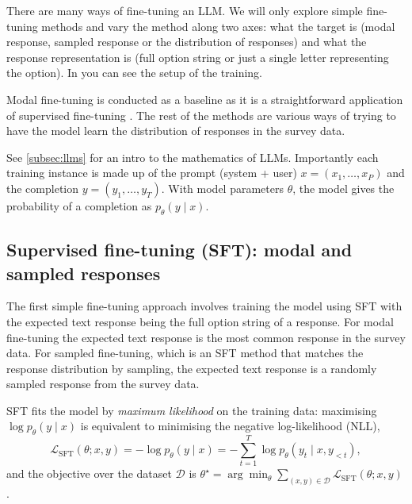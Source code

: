 There are many ways of fine-tuning an LLM. We will only explore simple fine-tuning methods and vary the method along two axes: what the target is (modal response, sampled response or the distribution of responses) and what the response representation is (full option string or just a single letter representing the option). In  you can see the setup of the training. 

Modal fine-tuning is conducted as a baseline as it is a straightforward application of supervised fine-tuning \cite{ouyangTrainingLanguageModels2022}. The rest of the methods are various ways of trying to have the model learn the distribution of responses in the survey data.

See \ref{subsec:llms} for an intro to the mathematics of LLMs. Importantly each training instance is made up of the prompt (system + user) $x=(x_1, \dots, x_P)$ and the completion $y=(y_1, \dots, y_T)$. With model parameters $\theta$, the model gives the probability of a completion as $p_\theta(y \mid x)$.



\subsection{Supervised fine-tuning (SFT): modal and sampled responses}

The first simple fine-tuning approach involves training the model using SFT with the expected text response being the full option string of a response. For modal fine-tuning the expected text response is the most common response in the survey data. For sampled fine-tuning, which is an SFT method that matches the response distribution by sampling, the expected text response is a randomly sampled response from the survey data.

SFT fits the model by \emph{maximum likelihood} on the training data:
maximising $\log p_\theta(y \mid x)$ is equivalent to minimising the
negative log-likelihood (NLL),
\begin{equation}
  \mathcal{L}_{\mathrm{SFT}}(\theta; x, y)
  = -\log p_\theta(y \mid x)
  = -\!\sum_{t=1}^{T} \log p_\theta\!\left(y_t \mid x, y_{<t}\right),
  \label{eq:nll}
\end{equation}
and the objective over the dataset $\mathcal{D}$ is
$\theta^\star = \arg\min_\theta \sum_{(x,y)\in\mathcal{D}} \mathcal{L}_{\mathrm{SFT}}(\theta; x, y)$.

